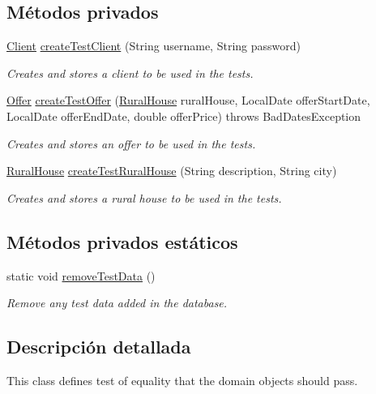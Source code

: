 \subsection*{Métodos privados}
\begin{DoxyCompactItemize}
\item 
\mbox{\hyperlink{a00164}{Client}} \mbox{\hyperlink{a00248_a08081415d14d86f7b8a63fe7270546dc}{create\+Test\+Client}} (String username, String password)
\begin{DoxyCompactList}\small\item\em Creates and stores a client to be used in the tests. \end{DoxyCompactList}\item 
\mbox{\hyperlink{a00184}{Offer}} \mbox{\hyperlink{a00248_a322f0b87565b40ecb1d9d0e6246ebaa0}{create\+Test\+Offer}} (\mbox{\hyperlink{a00188}{Rural\+House}} rural\+House, Local\+Date offer\+Start\+Date, Local\+Date offer\+End\+Date, double offer\+Price)  throws Bad\+Dates\+Exception 
\begin{DoxyCompactList}\small\item\em Creates and stores an offer to be used in the tests. \end{DoxyCompactList}\item 
\mbox{\hyperlink{a00188}{Rural\+House}} \mbox{\hyperlink{a00248_aaee652d5b230a23c765bd95b9691056b}{create\+Test\+Rural\+House}} (String description, String city)
\begin{DoxyCompactList}\small\item\em Creates and stores a rural house to be used in the tests. \end{DoxyCompactList}\end{DoxyCompactItemize}
\subsection*{Métodos privados estáticos}
\begin{DoxyCompactItemize}
\item 
static void \mbox{\hyperlink{a00248_a74a69f394f6e76a2f557132edbc2ea00}{remove\+Test\+Data}} ()
\begin{DoxyCompactList}\small\item\em Remove any test data added in the database. \end{DoxyCompactList}\end{DoxyCompactItemize}


\subsection{Descripción detallada}
This class defines test of equality that the domain objects should pass. 

